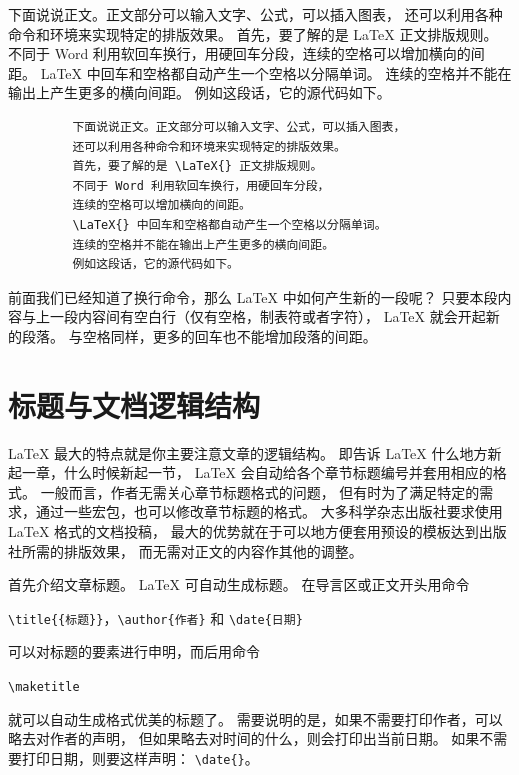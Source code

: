 下面说说正文。正文部分可以输入文字、公式，可以插入图表，
还可以利用各种命令和环境来实现特定的排版效果。
首先，要了解的是 \LaTeX{} 正文排版规则。
不同于 Word 利用软回车换行，用硬回车分段，连续的空格可以增加横向的间距。
\LaTeX{} 中回车和空格都自动产生一个空格以分隔单词。
连续的空格并不能在输出上产生更多的横向间距。
例如这段话，它的源代码如下。

{\small%
\begin{verbatim}
         下面说说正文。正文部分可以输入文字、公式，可以插入图表，
         还可以利用各种命令和环境来实现特定的排版效果。
         首先，要了解的是 \LaTeX{} 正文排版规则。
         不同于 Word 利用软回车换行，用硬回车分段，
         连续的空格可以增加横向的间距。
         \LaTeX{} 中回车和空格都自动产生一个空格以分隔单词。
         连续的空格并不能在输出上产生更多的横向间距。
         例如这段话，它的源代码如下。
\end{verbatim}}

前面我们已经知道了换行命令，那么 \LaTeX{} 中如何产生新的一段呢？
只要本段内容与上一段内容间有空白行（仅有空格，制表符或者字符），
\LaTeX{} 就会开起新的段落。
与空格同样，更多的回车也不能增加段落的间距。


\section{标题与文档逻辑结构}

\LaTeX{} 最大的特点就是你主要注意文章的逻辑结构。
即告诉 \LaTeX{} 什么地方新起一章，什么时候新起一节，
\LaTeX{} 会自动给各个章节标题编号并套用相应的格式。
一般而言，作者无需关心章节标题格式的问题，
但有时为了满足特定的需求，通过一些宏包，也可以修改章节标题的格式。
大多科学杂志出版社要求使用 \LaTeX{} 格式的文档投稿，
最大的优势就在于可以地方便套用预设的模板达到出版社所需的排版效果，
而无需对正文的内容作其他的调整。

首先介绍文章标题。
\LaTeX{} 可自动生成标题。
在导言区或正文开头用命令
\begin{center}
  \verb|\title{{标题}}|，\verb|\author{作者}| 和 \verb|\date{日期}|
\end{center}
可以对标题的要素进行申明，而后用命令
\begin{center}
  \verb|\maketitle|
\end{center}
就可以自动生成格式优美的标题了。
需要说明的是，如果不需要打印作者，可以略去对作者的声明，
但如果略去对时间的什么，则会打印出当前日期。
如果不需要打印日期，则要这样声明： \verb|\date{}|。

